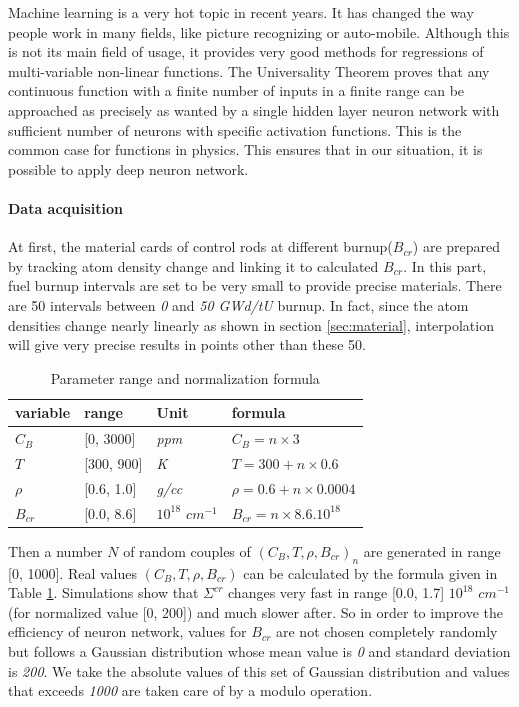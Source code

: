 Machine learning is a very hot topic in recent years.
It has changed the way people work in many fields, like picture recognizing or auto-mobile.
Although this is not its main field of usage,
it provides very good methods for regressions of multi-variable non-linear functions.
The Universality Theorem proves that any continuous function with a finite number of inputs in
a finite range can be approached as precisely as wanted
by a single hidden layer neuron network with sufficient number of neurons
with specific activation functions.
This is the common case for functions in physics.
This ensures that in our situation, it is possible to apply deep neuron network.

\paragraph{Data acquisition}
\label{sec:dnn_data}
At first, the material cards of control rods at different burnup($B_{cr}$) are prepared by tracking
atom density change and linking it to calculated $B_{cr}$.
In this part, fuel burnup intervals are set to be very small to provide precise materials.
There are 50 intervals between \textit{0} and \textit{50 GWd/tU} burnup.
In fact, since the atom densities change nearly linearly as shown in section \ref{sec:material},
interpolation will give very precise results in points other than these 50.

\begin{table}[!htb]
    \caption{Parameter range and normalization formula}
    \label{tab:norm}
    \centering
    \begin{tabular}{l l l l}
        \hline
        \textbf{variable} & \textbf{range} & \textbf{Unit}                & \textbf{formula}                 \\
        \hline
        $C_B$             & [0, 3000]      & \textit{ppm}                 & $C_B = n \times 3$               \\
        $T$               & [300, 900]     & \textit{K}                   & $T = 300 + n \times 0.6$         \\
        $\rho$            & [0.6, 1.0]     & \textit{g/cc}                & $\rho = 0.6 + n \times 0.0004$   \\
        $B_{cr}$          & [0.0, 8.6]     & \textit{$10^{18}$ $cm^{-1}$} & $B_{cr} = n \times 8.6.10^{18} $ \\
        \hline
    \end{tabular}
\end{table}
Then a number $N$ of random couples of $(C_B, T, \rho, B_{cr})_n$ are generated in range [0, 1000].
Real values $(C_B, T, \rho, B_{cr})$ can be calculated by the formula given in Table \ref{tab:norm}.
Simulations show that $\Sigma^{cr}$ changes very fast in range [0.0, 1.7] \textit{$10^{18}$ $cm^{-1}$}
(for normalized value [0, 200]) and much slower after.
So in order to improve the efficiency of neuron network, values for $B_{cr}$ are not chosen completely randomly
but follows a Gaussian distribution whose mean value is \textit{0} and standard deviation is \textit{200}.
We take the absolute values of this set of Gaussian distribution and
values that exceeds \textit{1000} are taken care of by a modulo operation.

